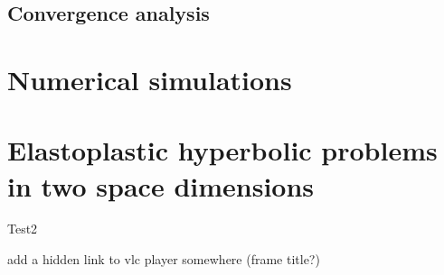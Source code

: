 \documentclass[11pt,aspectratio=169]{beamer}
\begin{document}
\subsection{Convergence analysis}

\section{Numerical simulations}

\section{Elastoplastic hyperbolic problems in two space dimensions}



\begin{frame}{Test2}
  \begin{center}
  \end{center}
  add a hidden link to vlc player somewhere (frame title?)
\end{frame}
\end{document}
